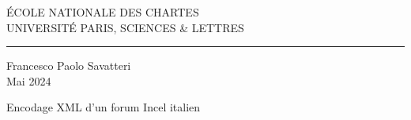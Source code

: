 \begin{center}
	
	\bigskip
	
	\begin{large}				
		ÉCOLE NATIONALE DES CHARTES\\
		UNIVERSITÉ PARIS, SCIENCES \& LETTRES
	\end{large}
	\begin{center}\rule{2cm}{0.02cm}\end{center}
	
	\bigskip
	\bigskip
	\bigskip
	\begin{large}
		Francesco Paolo Savatteri\\
		\vspace{1.3\baselineskip}
		Mai 2024
	\end{large}
	
	\vspace{8\baselineskip}
	
	\begin{Large}
		Encodage XML d'un forum Incel italien
	\end{Large}
	
	
	
	\vfill
	
	
\end{center}


\thispagestyle{empty}	
\cleardoublepage


